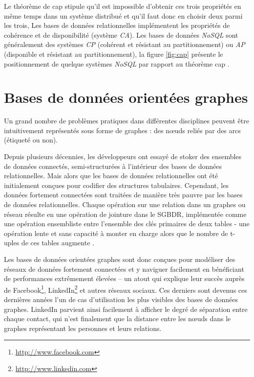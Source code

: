   

  Le théorème de \acrshort{cap} stipule qu'il est impossible d'obtenir
  ces trois propriétés en même temps dans un système distribué et
  qu'il faut donc en choisir deux parmi les trois, Les bases de
  données relationnelles implémentent les propriétés de cohérence et
  de disponibilité (système \emph{CA}). Les bases de données
  \emph{NoSQL} sont généralement des systèmes \emph{CP} (cohérent et
  résistant au partitionnement) ou \emph{AP} (disponible et résistant
  au partitionnement), la figure \ref{fig:cap} présente le
  positionnement de quelque systèmes \emph{NoSQL} par rapport au
  théorème \acrshort{cap} .

\section{Bases de données orientées graphes}
\label{sec:graph-database-overview}
\begin{text}
  Un grand nombre de problèmes pratiques dans différentes disciplines
  peuvent être intuitivement représentés sous forme de graphes : des
  nœuds reliés par des arcs (étiqueté ou non).

  Depuis plusieurs décennies, les développeurs ont essayé de stoker
  des ensembles de données connectés, semi-structurées à l'intérieur
  des bases de données relationnelles. Mais alors que les bases de
  données relationnelles ont été initialement conçues pour codifier
  des structures tabulaires. Cependant, les données fortement
  connectées sont traitées de manière très pauvre par les bases de
  données relationnelles. Chaque opération sur une relation dans un
  graphes ou réseau résulte en une opération de jointure dans le
  \acrshort{SGBDR}, implémentée comme une opération ensembliste entre
  l'ensemble des clés primaires de deux tables - une opération lente
  et sans capacité à monter en charge alors que le nombre de t-uples
  de ces tables augmente \cite{robinson2013graph}.

  Les bases de données orientées graphes sont donc conçues pour
  modéliser des réseaux de données fortement connectées et y naviguer
  facilement en bénéficiant de performances extrêmement élevées – un
  atout qui explique leur succès auprès de
  Facebook\footnote{\url{http://www.facebook.com}},
  LinkedIn\footnote{\url{http://www.linkedin.com}} et autres réseaux
  sociaux. Ces derniers sont devenus ces dernières années l'un de cas
  d'utilisation les plus visibles des bases de données graphes.
  LinkedIn parvient ainsi facilement à afficher le degré de séparation
  entre chaque contact, qui n'est finalement que la distance entre les
  nœuds dans le graphes représentant les personnes et leurs relations.
\end{text}


